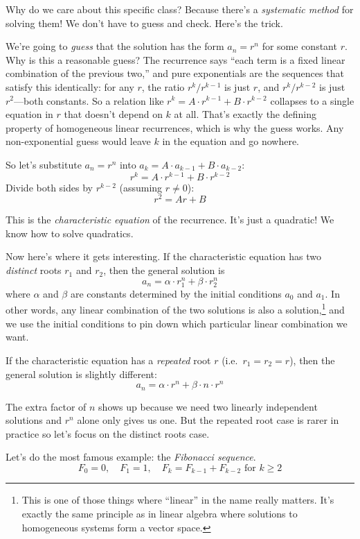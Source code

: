 \documentclass[11pt]{article}
\begin{document}
Why do we care about this specific class? Because there's a \emph{systematic method} for solving them! We don't have to guess and check. Here's the trick.

We're going to \emph{guess} that the solution has the form $a_n = r^n$ for some constant $r$. Why is this a reasonable guess? The recurrence says ``each term is a fixed linear combination of the previous two,'' and pure exponentials are the sequences that satisfy this identically: for any $r$, the ratio $r^k / r^{k-1}$ is just $r$, and $r^k / r^{k-2}$ is just $r^2$---both constants. So a relation like $r^k = A \cdot r^{k-1} + B \cdot r^{k-2}$ collapses to a single equation in $r$ that doesn't depend on $k$ at all. That's exactly the defining property of homogeneous linear recurrences, which is why the guess works. Any non-exponential guess would leave $k$ in the equation and go nowhere.

So let's substitute $a_n = r^n$ into $a_k = A \cdot a_{k-1} + B \cdot a_{k-2}$:
\[
r^k = A \cdot r^{k-1} + B \cdot r^{k-2}
\]
Divide both sides by $r^{k-2}$ (assuming $r \neq 0$):
\[
r^2 = Ar + B
\]

This is the \emph{characteristic equation} of the recurrence. It's just a quadratic! We know how to solve quadratics.

Now here's where it gets interesting. If the characteristic equation has two \emph{distinct} roots $r_1$ and $r_2$, then the general solution is
\[
a_n = \alpha \cdot r_1^n + \beta \cdot r_2^n
\]
where $\alpha$ and $\beta$ are constants determined by the initial conditions $a_0$ and $a_1$. In other words, any linear combination of the two solutions is also a solution,\footnote{This is one of those things where ``linear'' in the name really matters. It's exactly the same principle as in linear algebra where solutions to homogeneous systems form a vector space.} and we use the initial conditions to pin down which particular linear combination we want.

If the characteristic equation has a \emph{repeated} root $r$ (i.e.\ $r_1 = r_2 = r$), then the general solution is slightly different:
\[
a_n = \alpha \cdot r^n + \beta \cdot n \cdot r^n
\]

The extra factor of $n$ shows up because we need two linearly independent solutions and $r^n$ alone only gives us one. But the repeated root case is rarer in practice so let's focus on the distinct roots case.

Let's do the most famous example: the \emph{Fibonacci sequence}.
\[
F_0 = 0, \quad F_1 = 1, \quad F_k = F_{k-1} + F_{k-2} \text{ for } k \geq 2
\]
\end{document}
